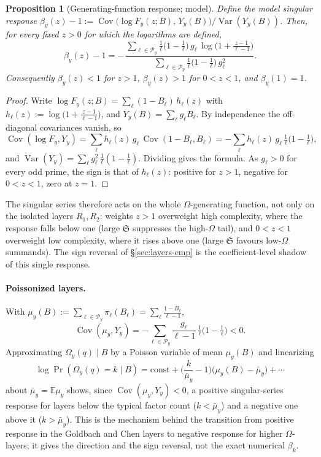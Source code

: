 \documentclass[]{interact}%
\newtheorem{proposition}{Proposition}
\newcommand{\OmegaF}{\Omega}
\newcommand{\sing}{\mathfrak S}
\newcommand{\Var}{\operatorname{Var}}
\begin{document}
\begin{proposition}[Generating-function response; model]\label{prop:omega-gf}
Define the model singular response
$\beta_y(z)-1:=\operatorname{Cov}\!\big(\log F_y(z;B),\,Y_y(B)\big)/\Var(Y_y(B))$. Then, for
every fixed $z>0$ for which the logarithms are defined,
\[
  \beta_y(z)-1=-\,
  \frac{\sum_{\ell\in\mathcal P_y}\frac1\ell\big(1-\frac1\ell\big)\,g_\ell\,\log\!\big(1+\frac{z-1}{\ell-1}\big)}
       {\sum_{\ell\in\mathcal P_y}\frac1\ell\big(1-\frac1\ell\big)\,g_\ell^2}.
\]
Consequently $\beta_y(z)<1$ for $z>1$, $\beta_y(z)>1$ for $0<z<1$, and $\beta_y(1)=1$.
\end{proposition}

\begin{proof}
Write $\log F_y(z;B)=\sum_{\ell}(1-B_\ell)\,h_\ell(z)$ with
$h_\ell(z):=\log\!\big(1+\frac{z-1}{\ell-1}\big)$, and $Y_y(B)=\sum_\ell g_\ell B_\ell$. By
independence the off-diagonal covariances vanish, so
\[
  \operatorname{Cov}(\log F_y,Y_y)
  =\sum_\ell h_\ell(z)\,g_\ell\,\operatorname{Cov}(1-B_\ell,B_\ell)
  =-\sum_\ell h_\ell(z)\,g_\ell\,\tfrac1\ell\big(1-\tfrac1\ell\big),
\]
and $\Var(Y_y)=\sum_\ell g_\ell^2\,\tfrac1\ell(1-\tfrac1\ell)$. Dividing gives the formula. As
$g_\ell>0$ for every odd prime, the sign is that of $h_\ell(z)$: positive for $z>1$, negative
for $0<z<1$, zero at $z=1$.
\end{proof}

The singular series therefore acts on the whole $\OmegaF$-generating function, not only on
the isolated layers $R_1,R_2$: weights $z>1$ overweight high complexity, where the response
falls below one (large $\sing$ suppresses the high-$\OmegaF$ tail), and $0<z<1$ overweight
low complexity, where it rises above one (large $\sing$ favours low-$\OmegaF$ summands). The
sign reversal of \S\ref{sec:layers-emp} is the coefficient-level shadow of this single
response.

\paragraph{Poissonized layers.}
With $\mu_y(B):=\sum_{\ell\in\mathcal P_y}\pi_\ell(B_\ell)=\sum_\ell\frac{1-B_\ell}{\ell-1}$,
\[
  \operatorname{Cov}(\mu_y,Y_y)=-\sum_{\ell\in\mathcal P_y}\frac{g_\ell}{\ell-1}\,\tfrac1\ell\big(1-\tfrac1\ell\big)<0 .
\]
Approximating $\OmegaF_y(q)\mid B$ by a Poisson variable of mean $\mu_y(B)$ and linearizing
\[
  \log\Pr(\OmegaF_y(q)=k\mid B)=\mathrm{const}+\Big(\frac{k}{\bar\mu_y}-1\Big)\big(\mu_y(B)-\bar\mu_y\big)+\cdots
\]
about $\bar\mu_y=\mathbb E\mu_y$ shows, since $\operatorname{Cov}(\mu_y,Y_y)<0$, a positive
singular-series response for layers below the typical factor count ($k<\bar\mu_y$) and a
negative one above it ($k>\bar\mu_y$). This is the mechanism behind the transition from
positive response in the Goldbach and Chen layers to negative response for higher
$\OmegaF$-layers; it gives the direction and the sign reversal, not the exact numerical
$\beta_k$.
\end{document}

